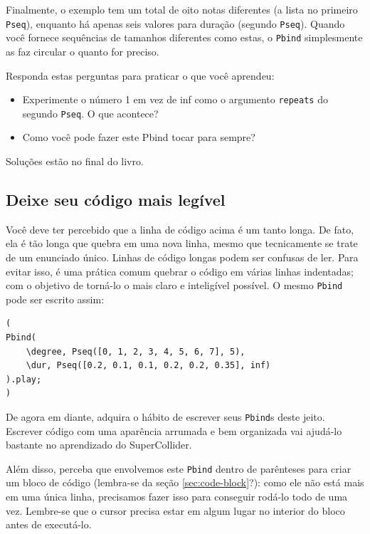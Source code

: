Finalmente, o exemplo tem um total de oito notas diferentes (a lista no primeiro \texttt{Pseq}), enquanto há apenas seis valores para duração (segundo \texttt{Pseq}). Quando você fornece sequências de tamanhos diferentes como estas, o \texttt{Pbind} simplesmente as faz circular o quanto for preciso.

Responda estas perguntas para praticar o que você aprendeu:
\begin{itemize}
\item Experimente o número 1 em vez de inf como o argumento \texttt{repeats} do segundo \texttt{Pseq}. O que acontece?
\item Como você pode fazer este Pbind tocar para sempre?
\end{itemize}

Soluções estão no final do livro.

\subsection{Deixe seu código mais legível}

Você deve ter percebido que a linha de código acima é um tanto longa. De fato, ela é tão longa que quebra em uma nova linha, mesmo que tecnicamente se trate de um enunciado único. Linhas de código longas podem ser confusas de ler. Para evitar isso, é uma prática comum quebrar o código em várias linhas indentadas; com o objetivo de torná-lo o mais claro e inteligível possível. O mesmo \texttt{Pbind} pode ser escrito assim:

\begin{lstlisting}[style=SuperCollider-IDE, basicstyle=\scttfamily\footnotesize]
(
Pbind(
	\degree, Pseq([0, 1, 2, 3, 4, 5, 6, 7], 5),
	\dur, Pseq([0.2, 0.1, 0.1, 0.2, 0.2, 0.35], inf)
).play;
)
\end{lstlisting}

De agora em diante, adquira o hábito de escrever seus \texttt{Pbind}s deste jeito. Escrever código com uma aparência arrumada e bem organizada vai ajudá-lo bastante no aprendizado do SuperCollider.

Além disso, perceba que envolvemos este \texttt{Pbind} dentro de parênteses para criar um bloco de código (lembra-se da seção \ref{sec:code-block}?): como ele não está mais em uma única linha, precisamos fazer isso para conseguir rodá-lo todo de uma vez. Lembre-se que o cursor precisa estar em algum lugar no interior do bloco antes de executá-lo.


